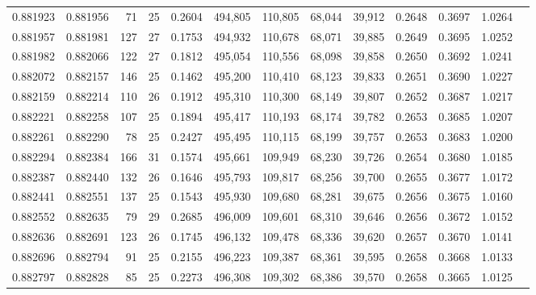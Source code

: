 \begin{tabular}{rrrrrrrrrrrrr}
0.881923 & 0.881956 &    71 &  25 &                                     0.2604 & 494,805 & 110,805 &  68,044 &  39,912 & 0.2648 & 0.3697 & 1.0264 \\
0.881957 & 0.881981 &   127 &  27 &                                     0.1753 & 494,932 & 110,678 &  68,071 &  39,885 & 0.2649 & 0.3695 & 1.0252 \\
0.881982 & 0.882066 &   122 &  27 &                                     0.1812 & 495,054 & 110,556 &  68,098 &  39,858 & 0.2650 & 0.3692 & 1.0241 \\
0.882072 & 0.882157 &   146 &  25 &                                     0.1462 & 495,200 & 110,410 &  68,123 &  39,833 & 0.2651 & 0.3690 & 1.0227 \\
0.882159 & 0.882214 &   110 &  26 &                                     0.1912 & 495,310 & 110,300 &  68,149 &  39,807 & 0.2652 & 0.3687 & 1.0217 \\
0.882221 & 0.882258 &   107 &  25 &                                     0.1894 & 495,417 & 110,193 &  68,174 &  39,782 & 0.2653 & 0.3685 & 1.0207 \\
0.882261 & 0.882290 &    78 &  25 &                                     0.2427 & 495,495 & 110,115 &  68,199 &  39,757 & 0.2653 & 0.3683 & 1.0200 \\
0.882294 & 0.882384 &   166 &  31 &                                     0.1574 & 495,661 & 109,949 &  68,230 &  39,726 & 0.2654 & 0.3680 & 1.0185 \\
0.882387 & 0.882440 &   132 &  26 &                                     0.1646 & 495,793 & 109,817 &  68,256 &  39,700 & 0.2655 & 0.3677 & 1.0172 \\
0.882441 & 0.882551 &   137 &  25 &                                     0.1543 & 495,930 & 109,680 &  68,281 &  39,675 & 0.2656 & 0.3675 & 1.0160 \\
0.882552 & 0.882635 &    79 &  29 &                                     0.2685 & 496,009 & 109,601 &  68,310 &  39,646 & 0.2656 & 0.3672 & 1.0152 \\
0.882636 & 0.882691 &   123 &  26 &                                     0.1745 & 496,132 & 109,478 &  68,336 &  39,620 & 0.2657 & 0.3670 & 1.0141 \\
0.882696 & 0.882794 &    91 &  25 &                                     0.2155 & 496,223 & 109,387 &  68,361 &  39,595 & 0.2658 & 0.3668 & 1.0133 \\
0.882797 & 0.882828 &    85 &  25 &                                     0.2273 & 496,308 & 109,302 &  68,386 &  39,570 & 0.2658 & 0.3665 & 1.0125 \\

\end{tabular}
